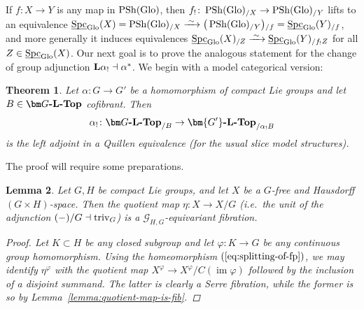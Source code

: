 \documentclass[reqno]{memo-l}
\theoremstyle{mythm}
\newtheorem{thm}{Theorem}[section]
\newtheorem{lemma}[thm]{Lemma}
\theoremstyle{definition}
\numberwithin{equation}{section}
\renewcommand{\phi}{\varphi}
\DeclareMathOperator{\Spc}{Spc}
\DeclareMathOperator{\PSh}{PSh}
\newcommand{\cat}[1]{\textbf{\textup{#1}}}
\newcommand{\triv}{{\textup{triv}}}
\newcommand{\Glo}{\textup{Glo}}
\newcommand{\ulhelper}[2]{\underline{\setbox0=\hbox{$#1#2$}\dp0=0.4pt \box0\relax}}
\newcommand{\ul}[1]{{\mathpalette\ulhelper{#1}}\hbox{\rule[-2pt]{0pt}{0pt}}}
\DeclareMathOperator{\im}{im}
\newcommand{\iso}{\xrightarrow{\;\smash{\raisebox{-0.25ex}{\ensuremath{\scriptstyle\sim}}}\;}}
\begin{document}
If $f\colon X\to Y$ is any map in $\PSh(\Glo)$, then $f_!\colon\PSh(\Glo)_{/X}\to\PSh(\Glo)_{/Y}$ lifts to an equivalence $\ul\Spc_{\Glo}(X)=\PSh(\Glo)_{/X}\iso\big(\PSh(\Glo)_{/Y}\big){}_{/f}=\ul\Spc_{\Glo}(Y)_{/f}$, and more generally it induces equivalences $\ul\Spc_{\Glo}(X)_{/Z}\iso\ul\Spc_{\Glo}(Y)_{/f_!Z}$ for all $Z\in\ul\Spc_{\Glo}(X)$. Our next goal is to prove the analogous statement for the change of group adjunction $\cat{L}\alpha_!\dashv\alpha^*$. We begin with a model categorical version:

\begin{thm}\label{thm:G-global-as-slice}
    Let $\alpha\colon G\to G'$ be a homomorphism of compact Lie groups and let $B\in\cat{$\bm G$-$\cat{L}$-Top}$ cofibrant. Then 
    \begin{equation}\label{eq:f_!-slice}
        \alpha_!\colon\cat{$\bm G$-$\cat{L}$-Top}_{/B}\to \cat{$\bm{G'}$-$\cat{L}$-Top}_{/\alpha_!B}
    \end{equation}
    is the left adjoint in a Quillen equivalence (for the usual slice model structures).
\end{thm}

The proof will require some preparations.

\begin{lemma}
    Let $G,H$ be compact Lie groups, and let $X$ be a $G$-free and Hausdorff $(G\times H)$-space. Then the quotient map $\eta\colon X\to X/G$ (i.e.\ the unit of the adjunction $(-)/G\dashv\triv_G$) is a $\mathcal G_{H,G}$-equivariant fibration.
    \begin{proof}
        Let $K\subset H$ be any closed subgroup and let $\phi\colon K\to G$ be any continuous group homomorphism. Using the homeomorphism $(\ref{eq:splitting-of-fp})$, we may identify $\eta^\phi$ with the quotient map $X^\phi\to X^\phi/C(\im\phi)$ followed by the inclusion of a disjoint summand. The latter is clearly a Serre fibration, while the former is so by Lemma~\ref{lemma:quotient-map-is-fib}.
    \end{proof}
\end{lemma}
\end{document}
